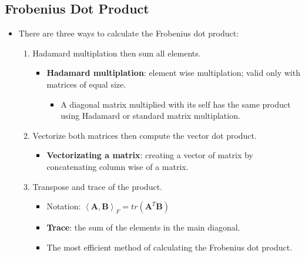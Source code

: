 \documentclass[12pt,a4paper]{article}
\begin{document}
\subsection{Frobenius Dot Product}
\begin{itemize}
    \item There are three ways to calculate the Frobenius dot product:
        \begin{enumerate}
            \item Hadamard multiplation then sum all elements.
                \begin{itemize}
                    \item \textbf{Hadamard multiplation}: element wise multiplation; valid only with matrices of equal size.
                    \begin{itemize}
                        \item A diagonal matrix multiplied with its self has the same product using Hadamard or standard matrix multiplation.
                    \end{itemize}
                \end{itemize}
            \item Vectorize both matrices then compute the vector dot product.
                \begin{itemize}
                    \item \textbf{Vectorizating a matrix}: creating a vector of matrix by concatenating column wise of a matrix.
                \end{itemize}
            \item Transpose and trace of the product.
                \begin{itemize}
                    \item Notation: \(\left\langle \textbf{A},\textbf{B}\right\rangle_F = tr(\textbf{A}^T\textbf{B}) \)
                    \item \textbf{Trace}: the sum of the elements in the main diagonal. 
                    \item The most efficient method of calculating the Frobenius dot product.
                \end{itemize}
        \end{enumerate}
\end{itemize}
\end{document}
